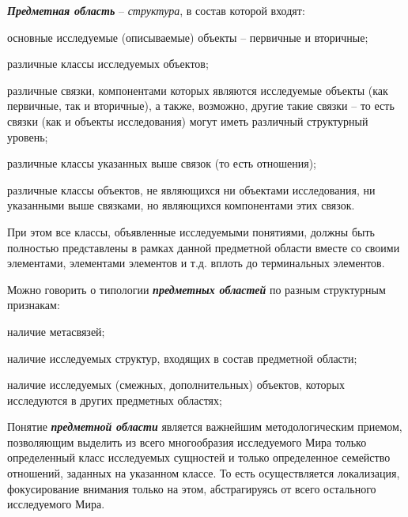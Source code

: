 \begin{SCn}
{\textbf{\textit{Предметная область}} – \textit{структура}, в состав которой входят:
\begin{scnenumerate}
\item \textnormal{основные исследуемые (описываемые) объекты – первичные и вторичные;}
\item \textnormal{различные классы исследуемых объектов;}
\item \textnormal{различные связки, компонентами которых являются исследуемые объекты (как первичные, так и вторичные), а также, возможно, другие такие связки – то есть связки (как и объекты исследования) могут иметь различный структурный уровень;}
\item \textnormal{различные классы указанных выше связок (то есть отношения);}
\item \textnormal{различные классы объектов, не являющихся ни объектами исследования, ни указанными выше связками, но являющихся компонентами этих связок.}
\end{scnenumerate}


При этом все классы, объявленные исследуемыми понятиями, должны быть полностью представлены в рамках данной предметной области вместе со своими элементами, элементами элементов и т.д. вплоть до терминальных элементов.


Можно говорить о типологии \textbf{\textit{предметных областей}} по разным структурным признакам:
\begin{scnitemize}
    \item наличие метасвязей;
    \item наличие исследуемых структур, входящих в состав предметной области;
    \item наличие исследуемых (смежных, дополнительных) объектов, которых исследуются в других предметных областях;
\end{scnitemize}


Понятие \textbf{\textit{предметной области}} является важнейшим методологическим приемом, позволяющим выделить из всего многообразия исследуемого Мира только определенный класс исследуемых сущностей и только определенное семейство отношений, заданных на указанном классе. То есть осуществляется локализация, фокусирование внимания только на этом, абстрагируясь от всего остального исследуемого Мира.


}
\end{SCn}
